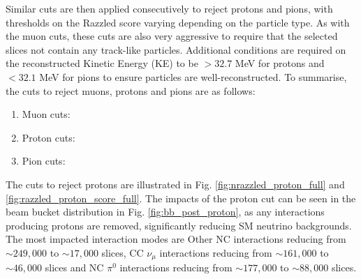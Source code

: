 Similar cuts are then applied consecutively to reject protons and pions, with thresholds on the Razzled score varying depending on the particle type.
As with the muon cuts, these cuts are also very aggressive to require that the selected slices not contain any track-like particles.
Additional conditions are required on the reconstructed Kinetic Energy (KE) to be $ > 32.7$ MeV for protons and $< 32.1$ MeV for pions to ensure particles are well-reconstructed. 
To summarise, the cuts to reject muons, protons and pions are as follows:
\begin{enumerate}
\item Muon cuts:
\item Proton cuts:
\item Pion cuts:
\end{enumerate}

The cuts to reject protons are illustrated in Fig. \ref{fig:nrazzled_proton_full} and \ref{fig:razzled_proton_score_full}.
The impacts of the proton cut can be seen in the beam bucket distribution in Fig. \ref{fig:bb_post_proton}, as any interactions producing protons are removed, significantly reducing SM neutrino backgrounds.
The most impacted interaction modes are Other NC interactions reducing from $\sim249,000$ to $\sim17,000$ slices, CC $\nu_\mu$ interactions reducing from $\sim161,000$ to $\sim46,000$ slices and NC $\pi^0$ interactions reducing from $\sim 177,000$ to $\sim88,000$ slices.


